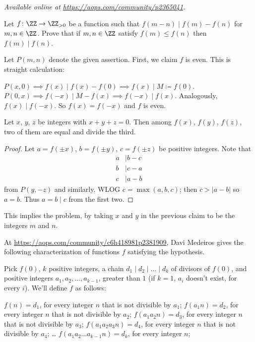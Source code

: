 \textsl{Available online at \url{https://aops.com/community/p2365041}.}
\begin{mdframed}[style=mdpurplebox,frametitle={Problem statement}]
Let $f \colon \ZZ \to \ZZ_{>0}$ be a function such that
$f(m-n) \mid f(m) - f(n)$ for $m,n \in \ZZ$.
Prove that if $m,n \in \ZZ$ satisfy $f(m) \le f(n)$
then $f(m) \mid f(n)$.
\end{mdframed}
Let $P(m,n)$ denote the given assertion.
First, we claim $f$ is even.
This is straight calculation:
\begin{itemize}
  \ii $P(x,0) \implies f(x) \mid f(x)-f(0)
  \implies f(x) \mid M \coloneqq f(0)$.
  \ii $P(0,x) \implies f(-x) \mid M-f(x) \implies
  f(-x) \mid f(x)$.
  Analogously, $f(x) \mid f(-x)$.
  So $f(x) = f(-x)$ and $f$ is even.
\end{itemize}

\begin{claim*}
  Let $x$, $y$, $z$ be integers with $x+y+z=0$.
  Then among $f(x)$, $f(y)$, $f(z)$,
  two of them are equal and divide the third.
\end{claim*}
\begin{proof}
  Let $a = f(\pm x)$, $b = f(\pm y)$, $c = f(\pm z)$
  be positive integers.
  Note that
  \begin{align*}
    a &\mid b-c \\
    b &\mid c-a \\
    c &\mid a-b
  \end{align*}
  from $P(y,-z)$ and similarly.
  WLOG $c = \max(a,b,c)$; then $c > |a-b|$
  so $a=b$.  Thus $a=b \mid c$ from the first two.
\end{proof}
This implies the problem,
by taking $x$ and $y$ in the previous claim
to be the integers $m$ and $n$.

\begin{remark*}
  At \url{https://aops.com/community/c6h418981p2381909},
  Davi Medeiros gives the following characterization
  of functions $f$ satisfying the hypothesis.

  Pick $f(0)$, $k$ positive integers,
  a chain $d_1 \mid d_2 \mid \dots \mid d_k$ of divisors of $f(0)$,
  and positive integers $a_1,a_2,\dots,a_{k-1}$,
  greater than $1$ (if $k=1$, $a_i$ doesn't exist, for every $i$).
  We'll define $f$ as follows:
  \begin{itemize}
    \ii $f(n)=d_1$, for every integer $n$ that is not divisible by $a_1$;
    \ii $f(a_1n)=d_2$, for every integer $n$ that is not divisible by $a_2$;
    \ii $f(a_1a_2n)=d_3$, for every integer $n$ that is not divisible by $a_3$;
    \ii $f(a_1a_2a_3n)=d_4$, for every integer $n$ that is not divisible by $a_4$;
    \ii \dots
    \ii $f(a_1a_2 \dots a_{k-1}n)=d_k$, for every integer $n$;
  \end{itemize}
\end{remark*}
\pagebreak